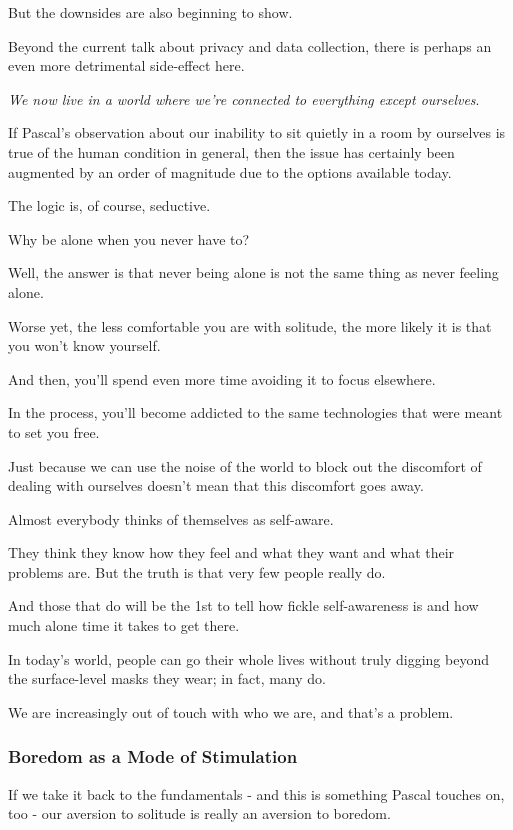 \documentclass{article}
\begin{document}
But the downsides are also beginning to show.

Beyond the current talk about privacy and data collection, there is perhaps an even more detrimental side-effect here.

%
\textit{We now live in a world where we're connected to everything except ourselves}.

%
If Pascal's observation about our inability to sit quietly in a room by ourselves is true of the human condition in general, then the issue has certainly been augmented by an order of magnitude due to the options available today.

%
The logic is, of course, seductive.

Why be alone when you never have to?

%
Well, the answer is that never being alone is not the same thing as never feeling alone.

Worse yet, the less comfortable you are with solitude, the more likely it is that you won't know yourself.

And then, you'll spend even more time avoiding it to focus elsewhere.

In the process, you'll become addicted to the same technologies that were meant to set you free.

%
Just because we can use the noise of the world to block out the discomfort of dealing with ourselves doesn't mean that this discomfort goes away.

%
Almost everybody thinks of themselves as self-aware.

They think they know how they feel and what they want and what their problems are. But the truth is that very few people really do.

And those that do will be the 1st to tell how fickle self-awareness is and how much alone time it takes to get there.

%
In today's world, people can go their whole lives without truly digging beyond the surface-level masks they wear; in fact, many do.

%
We are increasingly out of touch with who we are, and that's a problem.

\subsubsection{Boredom as a Mode of Stimulation}
If we take it back to the fundamentals - and this is something Pascal touches on, too - our aversion to solitude is really an aversion to boredom.
\end{document}
